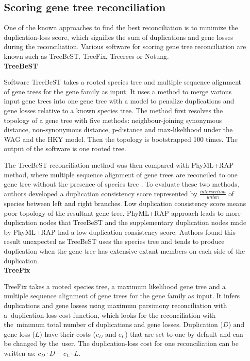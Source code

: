 \subsection{Scoring gene tree reconciliation}
One of the known approaches to find the best reconciliation is to minimize the duplication-loss score, which signifies the sum of duplications and gene losses during the reconciliation. Various software for scoring gene tree reconciliation are known such as TreeBeST, TreeFix, Treerecs or Notung.\\
\textbf{TreeBeST} 

Software TreeBeST \cite{treebest_online} takes a rooted species tree and multiple sequence alignment of gene trees for the gene family as input. It uses a method to merge various input gene trees into one gene tree with a model to penalize duplications and gene losses relative to a known species tree. The method first resolves the topology of a gene tree with five methods: neighbour-joining synonymous distance, non-synonymous distance, p-distance and max-likelihood under the WAG and the HKY model. Then the topology is bootstrapped 100 times. The output of the software is one rooted tree.

The TreeBeST reconciliation method was then compared with PhyML+RAP method, where multiple sequence alignment of gene trees are reconciled to one gene tree without the presence of species tree \cite{treebest}. To evaluate these two methods, authors developed a duplication consistency score represented by \( \frac{intersection}{union} \) of species between left and right branches. Low duplication consistency score means poor topology of the resultant gene tree. PhyML+RAP approach leads to more duplication nodes that TreeBeST and the supplementary duplication nodes made by PhyML+RAP had a low duplication consistency score. Authors found this result unexpected as TreeBeST uses the species tree and tends to produce duplication when the gene tree has extensive extant members on each side of the duplication.\\
\textbf{TreeFix}  

TreeFix \cite{treefix_tutorial} takes a rooted species tree, a maximum likelihood gene tree and a multiple sequence alignment of gene trees for the gene family as input. It infers duplications and gene losses using maximum parsimony reconciliation with a~duplication-loss cost function, which looks for the reconciliation with the~minimum total number of duplications and gene losses. Duplication ($D$) and gene loss ($L$) have their costs ($c_D$ and $c_L$) that are set to one by default and can be changed by the~user. The duplication-loss cost for one reconciliation can be written as: $c_D \cdot D+c_L \cdot L$. 

